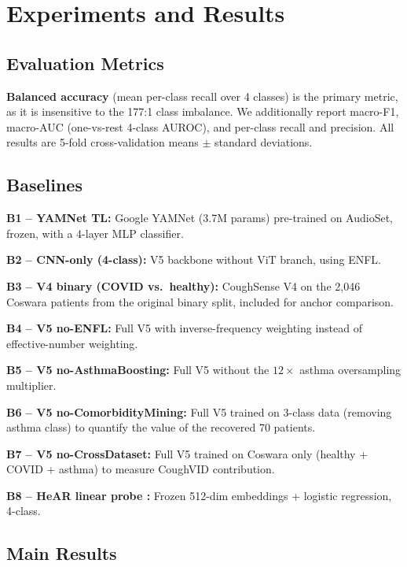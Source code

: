 \documentclass[journal]{IEEEtran}
\begin{document}
\section{Experiments and Results}
\label{sec:results}

\subsection{Evaluation Metrics}

\textbf{Balanced accuracy} (mean per-class recall over 4 classes)
is the primary metric, as it is insensitive to the 177:1 class
imbalance. We additionally report macro-F1, macro-AUC (one-vs-rest
4-class AUROC), and per-class recall and precision. All results
are 5-fold cross-validation means $\pm$ standard deviations.

\subsection{Baselines}

\textbf{B1 -- YAMNet TL:} Google YAMNet (3.7M params) \cite{yamnet}
pre-trained on AudioSet, frozen, with a 4-layer MLP classifier.

\textbf{B2 -- CNN-only (4-class):} V5 backbone without ViT branch,
using ENFL.

\textbf{B3 -- V4 binary (COVID vs.\ healthy):} CoughSense V4 on
the 2,046 Coswara patients from the original binary split, included
for anchor comparison.

\textbf{B4 -- V5 no-ENFL:} Full V5 with inverse-frequency
weighting instead of effective-number weighting.

\textbf{B5 -- V5 no-AsthmaBoosting:} Full V5 without the $12{\times}$
asthma oversampling multiplier.

\textbf{B6 -- V5 no-ComorbidityMining:} Full V5 trained on
3-class data (removing asthma class) to quantify the value of the
recovered 70 patients.

\textbf{B7 -- V5 no-CrossDataset:} Full V5 trained on Coswara only
(healthy + COVID + asthma) to measure CoughVID contribution.

\textbf{B8 -- HeAR linear probe \cite{hear2024}:} Frozen 512-dim
embeddings + logistic regression, 4-class.

\subsection{Main Results}
\end{document}
